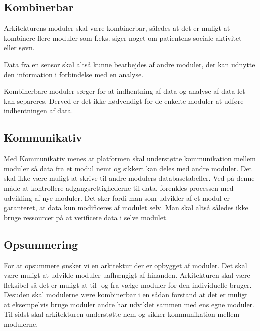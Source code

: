 \subsection{Kombinerbar}\label{arkitekturkrav::kombinerbar}
Arkitekturens moduler skal være kombinerbar, således at det er muligt at kombinere flere moduler som f.eks. siger noget om patientens sociale aktivitet eller søvn.

Data fra en sensor skal altså kunne bearbejdes af andre moduler, der kan udnytte den information i forbindelse med en analyse.

Kombinerbare moduler sørger for at indhentning af data og analyse af data let kan separeres.
Derved er det ikke nødvendigt for de enkelte moduler at udføre indhentningen af data.

\subsection{Kommunikativ}\label{arkitekturkrav::kommunikation}
Med Kommunikativ menes at platformen skal understøtte kommunikation mellem moduler så data fra et modul nemt og sikkert kan deles med andre moduler.
Det skal ikke være muligt at skrive til andre modulers databasetabeller.
Ved på denne måde at kontrollere adgangsrettighederne til data, forenkles processen med udvikling af nye moduler.
Det sker fordi man som udvikler af et modul er garanteret, at data kun modificeres af modulet selv.
Man skal altså således ikke bruge ressourcer på at verificere data i selve modulet.

\subsection{Opsummering}
For at opsummere ønsker vi en arkitektur der er opbygget af moduler.
Det skal være muligt at udvikle moduler uafhængigt af hinanden.
Arkitekturen skal være fleksibel så det er muligt at til- og fra-vælge moduler for den individuelle bruger.
Desuden skal modulerne være kombinerbar i en sådan forstand at det er muligt at eksempelvis bruge moduler andre har udviklet sammen med ens egne moduler.
Til sidst skal arkitekturen understøtte nem og sikker kommunikation mellem modulerne.

